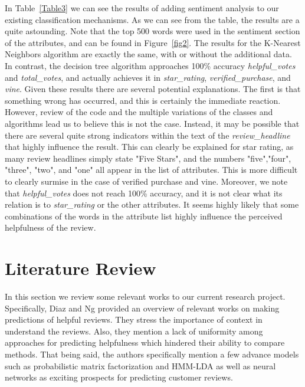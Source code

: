 \documentclass[10pt, conference, compsocconf]{IEEEtran}
\begin{document}
In Table~\ref{Table3} we can see the results of adding sentiment analysis to our existing classification mechanisms. As we can see from the table, the results are a quite astounding. Note that the top 500 words were used in the sentiment section of the attributes, and can be found in Figure~\ref{fig2}. The results for the K-Nearest Neighbors algorithm are exactly the same, with or without the additional data. In contrast, the decision tree algorithm approaches 100\% accuracy \textit{helpful\_votes} and \textit{total\_votes}, and actually achieves it in \textit{star\_rating}, \textit{verified\_purchase}, and \textit{vine}. Given these results there are several potential explanations. The first is that something wrong has occurred, and this is certainly the immediate reaction. However, review of the code and the multiple variations of the classes and algorithms lead us to believe this is not the case. Instead, it may be possible that there are several quite strong indicators within the text of the \textit{review\_headline} that highly influence the result. This can clearly be explained for star rating, as many review headlines simply state "Five Stars", and the numbers "five","four", "three", "two", and "one" all appear in the list of attributes. This is more difficult to clearly surmise in the case of verified purchase and vine. Moreover, we note that \textit{helpful\_votes} does not reach 100\% accuracy, and it is not clear what its relation is to \textit{star\_rating} or the other attributes. It seems highly likely that some combinations of the words in the attribute list highly influence the perceived helpfulness of the review.

\section{Literature Review}

In this section we review some relevant works to our current research project. Specifically, Diaz and Ng \cite{ocampo} provided an overview of relevant works on making predictions of helpful reviews. They stress the importance of context in understand the reviews. Also, they mention a lack of uniformity among approaches for predicting helpfulness which hindered their ability to compare methods. That being said, the authors specifically mention a few advance models such as probabilistic matrix factorization and HMM-LDA as well as neural networks as exciting prospects for predicting customer reviews.
\end{document}
